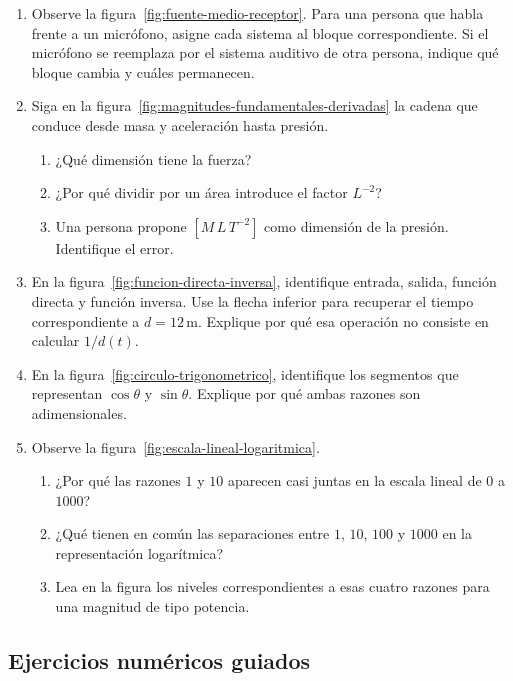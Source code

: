 \begin{enumerate}[label=\textbf{R\arabic*.},leftmargin=*]
    \item Observe la figura~\ref{fig:fuente-medio-receptor}. Para una persona que habla frente a un micrófono, asigne cada sistema al bloque correspondiente. Si el micrófono se reemplaza por el sistema auditivo de otra persona, indique qué bloque cambia y cuáles permanecen.

    \item Siga en la figura~\ref{fig:magnitudes-fundamentales-derivadas} la cadena que conduce desde masa y aceleración hasta presión.
    \begin{enumerate}[label=\alph*)]
        \item ¿Qué dimensión tiene la fuerza?
        \item ¿Por qué dividir por un área introduce el factor \(L^{-2}\)?
        \item Una persona propone \([M\,L\,T^{-2}]\) como dimensión de la presión. Identifique el error.
    \end{enumerate}

    \item En la figura~\ref{fig:funcion-directa-inversa}, identifique entrada, salida, función directa y función inversa. Use la flecha inferior para recuperar el tiempo correspondiente a \(d=12\,\text{m}\). Explique por qué esa operación no consiste en calcular \(1/d(t)\).

    \item En la figura~\ref{fig:circulo-trigonometrico}, identifique los segmentos que representan \(\cos\theta\) y \(\sin\theta\). Explique por qué ambas razones son adimensionales.

    \item Observe la figura~\ref{fig:escala-lineal-logaritmica}.
    \begin{enumerate}[label=\alph*)]
        \item ¿Por qué las razones \(1\) y \(10\) aparecen casi juntas en la escala lineal de \(0\) a \(1000\)?
        \item ¿Qué tienen en común las separaciones entre \(1\), \(10\), \(100\) y \(1000\) en la representación logarítmica?
        \item Lea en la figura los niveles correspondientes a esas cuatro razones para una magnitud de tipo potencia.
    \end{enumerate}
\end{enumerate}

\subsection*{Ejercicios numéricos guiados}

